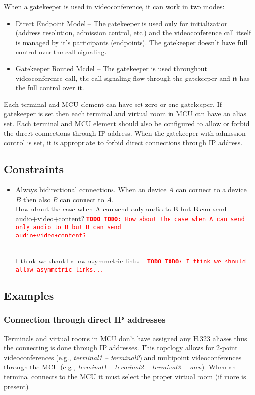 \documentclass[a4paper]{report}
\newcommand{\TODO}[1]{%
\def\empty{}%
\def\prvniparametr{#1}%
\ifx\prvniparametr\empty%
\begingroup\tt\textcolor{red}{\noindent\textbf{TODO}}\endgroup
\else%
\begingroup\tt\textcolor{red}{\noindent\textbf{TODO:}\ #1}\endgroup
\fi%
}
\begin{document}
When a gatekeeper is used in videoconference, it can work in two modes:
\begin{itemize}
\item Direct Endpoint Model -- The gatekeeper is used only for initialization (address resolution, admission control, etc.) and the videoconference call itself is managed by it's participants (endpoints). The gatekeeper doesn't have full control over the call signaling.
\item Gatekeeper Routed Model -- The gatekeeper is used throughout videoconference call, the call signaling flow through the gatekeeper and it has the full control over it.
\end{itemize}

Each terminal and MCU element can have set zero or one gatekeeper. If gatekeeper is set then each terminal and virtual room in MCU can have an alias set. Each terminal and MCU element should also be configured to allow or forbid the direct connections through IP address. When the gatekeeper with admission control is set, it is appropriate to forbid direct connections through IP address.


\subsection{Constraints}

\begin{itemize}

\item Always bidirectional connections. When an device $A$ can connect to a device $B$ then also $B$ can connect to $A$.
\\ \TODO{How about the case when A can send only audio to B but B can send \\ audio+video+content?}
\\ \TODO{I think we should allow asymmetric links...}

\end{itemize}


\subsection{Examples}

\subsubsection{Connection through direct IP addresses}

Terminals and virtual rooms in MCU don't have assigned any H.323 aliases thus the connecting is done through IP addresses. This topology allows for 2-point videoconferences (e.g., \emph{terminal1 -- terminal2}) and multipoint videoconferences through the MCU (e.g., \emph{terminal1 -- terminal2 -- terminal3 -- mcu}). When an terminal connects to the MCU it must select the proper virtual room (if more is present).
\end{document}
